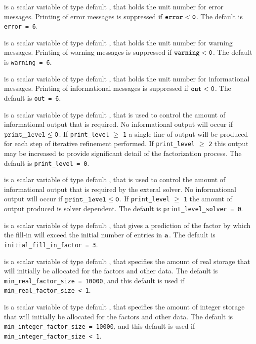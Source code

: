 \documentclass{galahad}
\begin{document}
\begin{description}

 is a scalar variable of type default \integer, that holds the
unit number for error messages.
Printing of error messages is suppressed if ${\tt error} < {\tt 0}$.
The default is {\tt error = 6}.

 is a scalar variable of type default \integer, that holds the
unit number for warning messages.
Printing of warning messages is suppressed if ${\tt warning} < {\tt 0}$.
The default is {\tt warning = 6}.

 is a scalar variable of type default \integer, that holds the
unit number for informational messages.
Printing of informational messages is suppressed if ${\tt out} < {\tt 0}$.
The default is {\tt out = 6}.

 is a scalar variable of type default \integer,
that is used
to control the amount of informational output that is required. No
informational output will occur if ${\tt print\_level} \leq {\tt 0}$. If
{\tt print\_level} $\geq$ {\tt 1} a single line of output will be produced
for each step of iterative refinement performed.
If {\tt print\_level} $\geq$ {\tt 2} this output
may be increased to provide significant detail of the factorization process.
The default is {\tt print\_level = 0}.

 is a scalar variable of type default \integer,
that is used
to control the amount of informational output that is required by the exteral
solver. No
informational output will occur if ${\tt print\_level} \leq {\tt 0}$. If
{\tt print\_level} $\geq$ {\tt 1} the amount of output produced is solver
dependent.
The default is {\tt print\_level\_solver = 0}.

 is a scalar variable of type default \integer,
that gives a prediction of the factor by which the fill-in will exceed
the initial number of entries in ${\mathbf{a}}$.
The default is {\tt initial\_fill\_in\_factor = 3}.

 is a scalar variable of type default \integer,
that specifies the amount of real storage that will initially be
allocated for the factors and other data.
The default is {\tt min\_real\_factor\_size = 10000},
and this default is used if {\tt min\_real\_factor\_size < 1}.

 is a scalar variable of type default \integer,
that specifies the amount of integer storage that will initially be
allocated for the factors and other data.
The default is {\tt min\_integer\_factor\_size = 10000},
and this default is used if {\tt min\_integer\_factor\_size < 1}.


\end{description}
\end{document}

